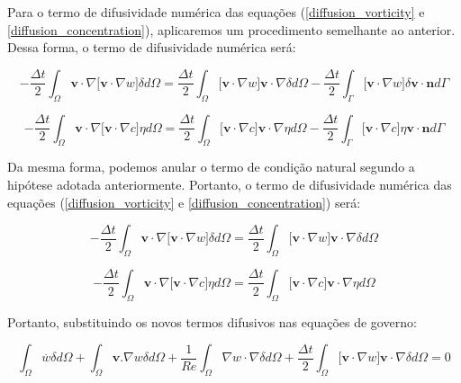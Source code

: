 \medskip
Para o termo de difusividade numérica das equações
(\ref{diffusion_vorticity} e \ref{diffusion_concentration}),
aplicaremos um procedimento semelhante ao anterior. 
Dessa forma, o termo de difusividade numérica será:

\begin{equation}
 - \frac{\Delta t}{2} \int_{\Omega} \textbf{v} \cdot \nabla \big[ \textbf{v} \cdot \nabla w \big] \delta d\Omega
 = 
 \frac{\Delta t}{2} \int_{\Omega} \big[ \textbf{v} \cdot \nabla w \big] \textbf{v} \cdot \nabla \delta d\Omega
 - \frac{\Delta t}{2} \int_{\Gamma} \big[ \textbf{v} \cdot \nabla w \big] \delta \textbf{v} \cdot \textbf{n} d\Gamma
\end{equation}

\begin{equation}
 - \frac{\Delta t}{2} \int_{\Omega} \textbf{v} \cdot \nabla \big[ \textbf{v} \cdot \nabla c \big] \eta d\Omega
 = 
 \frac{\Delta t}{2} \int_{\Omega} \big[ \textbf{v} \cdot \nabla c \big] \textbf{v} \cdot \nabla \eta d\Omega
 - \frac{\Delta t}{2} \int_{\Gamma} \big[ \textbf{v} \cdot \nabla c \big] \eta \textbf{v} \cdot \textbf{n} d\Gamma
\end{equation}


\newpage
Da mesma forma, podemos anular o termo de condição
natural segundo a hipótese adotada anteriormente.
Portanto, o termo de difusividade numérica das
equações (\ref{diffusion_vorticity} e \ref{diffusion_concentration}) será:

\begin{equation}
 - \frac{\Delta t}{2} \int_{\Omega} \textbf{v} \cdot \nabla \big[ \textbf{v} \cdot \nabla w \big] \delta d\Omega
 = 
 \frac{\Delta t}{2} \int_{\Omega} \big[ \textbf{v} \cdot \nabla w \big] \textbf{v} \cdot \nabla \delta d\Omega
\end{equation}

\begin{equation}
 - \frac{\Delta t}{2} \int_{\Omega} \textbf{v} \cdot \nabla \big[ \textbf{v} \cdot \nabla c \big] \eta d\Omega
 = 
 \frac{\Delta t}{2} \int_{\Omega} \big[ \textbf{v} \cdot \nabla c \big] \textbf{v} \cdot \nabla \eta d\Omega
\end{equation}

\medskip
\noindent
Portanto, substituindo os novos termos difusivos nas equações de governo:

\begin{equation} \label{vorticity weak} 
   \int_{\Omega} \overset{.}{w} \delta d\Omega 
 + \int_{\Omega} \textbf{v}.\nabla w \delta d\Omega 
 + \frac{1}{\textit{Re}} \int_{\Omega} \nabla w \cdot \nabla \delta d\Omega 
 + \frac{\Delta t}{2} \int_{\Omega} \big[ \textbf{v} \cdot \nabla w \big] \textbf{v} \cdot \nabla \delta d\Omega
 = 0
\end{equation}

